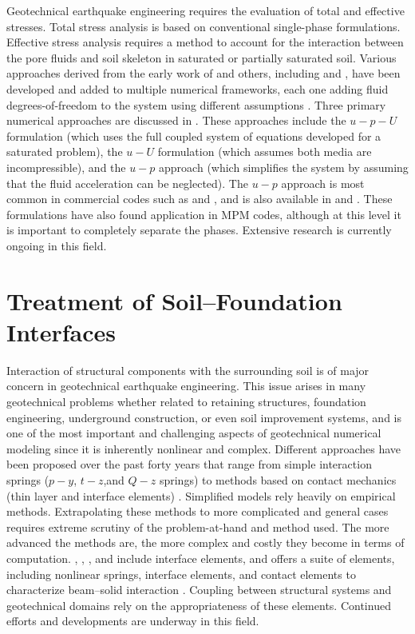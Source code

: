 Geotechnical earthquake engineering requires the evaluation of total and effective stresses. Total stress analysis is based on conventional single-phase formulations. Effective stress analysis requires a method to account for the interaction between the pore fluids and soil skeleton in saturated or partially saturated soil. Various approaches derived from the early work of \citet{Biot41, Biot56, Biot62} and others, including \citet{Borja06} and \citet{Ehlers02}, have been developed and added to multiple numerical frameworks, each one adding fluid degrees-of-freedom to the system using different assumptions \citep{Arduino01}. Three primary numerical approaches are discussed in \citet{Zienk84}. These approaches include the $u-p-U$ formulation (which uses the full coupled system of equations developed for a saturated problem), the $u-U$ formulation (which assumes both media are incompressible), and the $u-p$ approach (which simplifies the system by assuming that the fluid acceleration can be neglected). The $u-p$ approach is most common in commercial codes such as  and , and is also available in  and . These formulations have also found application in MPM codes, although at this level it is important to completely separate the phases. Extensive research is currently ongoing in this field. 

\section{Treatment of Soil--Foundation Interfaces}
\label{sec:resp_geotech_3}

Interaction of structural components with the surrounding soil is of major concern in geotechnical earthquake engineering. This issue arises in many geotechnical problems whether related to retaining structures, foundation engineering, underground construction, or even soil improvement systems, and is one of the most important and challenging aspects of geotechnical numerical modeling since it is inherently nonlinear and complex. Different approaches have been proposed over the past forty years that range from simple interaction springs ($p-y$, $t-z$,and $Q-z$ springs) \citep{API07} to methods based on contact mechanics (thin layer and interface elements) \citep[see][]{Laursen02}. Simplified models rely heavily on empirical methods. Extrapolating these methods to more complicated and general cases requires extreme scrutiny of the problem-at-hand and method used. The more advanced the methods are, the more complex and costly they become in terms of computation. , , , and  include interface elements, and  offers a suite of elements, including nonlinear springs, interface elements, and contact elements to characterize beam--solid interaction \citep[see][]{Petek06, Ghofrani18}. Coupling between structural systems and geotechnical domains rely on the appropriateness of these elements. Continued efforts and developments are underway in this field. 

